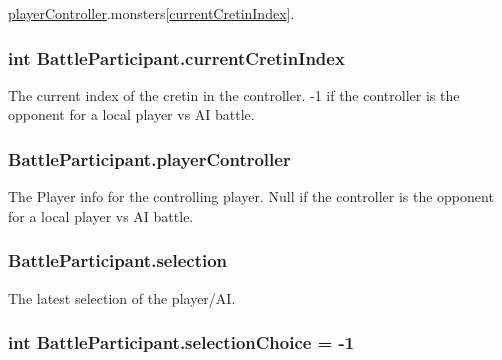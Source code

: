 {\ttfamily \hyperlink{class_battle_participant_a2f1584b2283c99eaaaa8e5b66ced968f}{player\-Controller}.monsters\mbox{[}\hyperlink{class_battle_participant_a1ad2e6be9469ff3c433be70fc6245484}{current\-Cretin\-Index}\mbox{]}}. \hypertarget{class_battle_participant_a1ad2e6be9469ff3c433be70fc6245484}{
\subsubsection[{current\-Cretin\-Index}]{\setlength{\rightskip}{0pt plus 5cm}int Battle\-Participant.\-current\-Cretin\-Index}}\label{class_battle_participant_a1ad2e6be9469ff3c433be70fc6245484}


The current index of the cretin in the controller. -\/1 if the controller is the opponent for a local player vs A\-I battle. 

\hypertarget{class_battle_participant_a2f1584b2283c99eaaaa8e5b66ced968f}{
\subsubsection[{player\-Controller}]{ Battle\-Participant.\-player\-Controller}}\label{class_battle_participant_a2f1584b2283c99eaaaa8e5b66ced968f}


The Player info for the controlling player. Null if the controller is the opponent for a local player vs A\-I battle. 

\hypertarget{class_battle_participant_abf036cb064ddcd97270c1b9ed8442f50}{
\subsubsection[{selection}]{ Battle\-Participant.\-selection}}\label{class_battle_participant_abf036cb064ddcd97270c1b9ed8442f50}


The latest selection of the player/\-A\-I. 

\hypertarget{class_battle_participant_a30032b373a898bbb16f67e24bf245557}{
\subsubsection[{selection\-Choice}]{\setlength{\rightskip}{0pt plus 5cm}int Battle\-Participant.\-selection\-Choice = -\/1}}\label{class_battle_participant_a30032b373a898bbb16f67e24bf245557}


